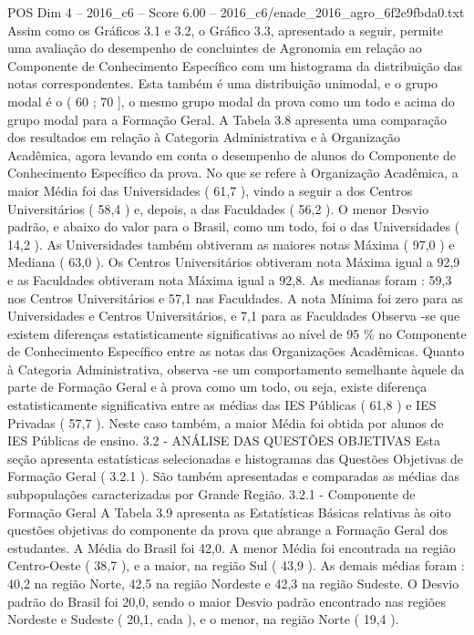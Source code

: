\begin{textsample}{POS Dim 4 – 2016\_c6 – Score 6.00 – 2016\_c6/enade\_2016\_agro\_6f2e9fbda0.txt}
Assim como os Gráficos 3.1 e 3.2, o Gráfico 3.3, apresentado a seguir, permite uma avaliação do desempenho de concluintes de Agronomia em relação ao Componente de Conhecimento Específico com um histograma da distribuição das notas correspondentes.
Esta também é uma distribuição unimodal, e o grupo modal é o ( 60 ; 70 ], o mesmo grupo modal da prova como um todo e acima do grupo modal para a Formação Geral.
A Tabela 3.8 apresenta uma comparação dos resultados em relação à Categoria Administrativa e à Organização Acadêmica, agora levando em conta o desempenho de alunos do Componente de Conhecimento Específico da prova.
No que se refere à Organização Acadêmica, a maior Média foi das Universidades ( 61,7 ), vindo a seguir a dos Centros Universitários ( 58,4 ) e, depois, a das Faculdades ( 56,2 ).
O menor Desvio padrão, e abaixo do valor para o Brasil, como um todo, foi o das Universidades ( 14,2 ).
As Universidades também obtiveram as maiores notas Máxima ( 97,0 ) e Mediana ( 63,0 ).
Os Centros Universitários obtiveram nota Máxima igual a 92,9 e as Faculdades obtiveram nota Máxima igual a 92,8.
As medianas foram : 59,3 nos Centros Universitários e 57,1 nas Faculdades.
A nota Mínima foi zero para as Universidades e Centros Universitários, e 7,1 para as Faculdades Observa -se que existem diferenças estatisticamente significativas ao nível de 95 \% no Componente de Conhecimento Específico entre as notas das Organizações Acadêmicas.
Quanto à Categoria Administrativa, observa -se um comportamento semelhante àquele da parte de Formação Geral e à prova como um todo, ou seja, existe diferença estatisticamente significativa entre as médias das IES Públicas ( 61,8 ) e IES Privadas ( 57,7 ).
Neste caso também, a maior Média foi obtida por alunos de IES Públicas de ensino. 3.2 - ANÁLISE DAS QUESTÕES OBJETIVAS Esta seção apresenta estatísticas selecionadas e histogramas das Questões Objetivas de Formação Geral ( 3.2.1 ).
São também apresentadas e comparadas as médias das subpopulações caracterizadas por Grande Região. 3.2.1 - Componente de Formação Geral A Tabela 3.9 apresenta as Estatísticas Básicas relativas às oito questões objetivas do componente da prova que abrange a Formação Geral dos estudantes.
A Média do Brasil foi 42,0.
A menor Média foi encontrada na região Centro-Oeste ( 38,7 ), e a maior, na região Sul ( 43,9 ).
As demais médias foram : 40,2 na região Norte, 42,5 na região Nordeste e 42,3 na região Sudeste.
O Desvio padrão do Brasil foi 20,0, sendo o maior Desvio padrão encontrado nas regiões Nordeste e Sudeste ( 20,1, cada ), e o menor, na região Norte ( 19,4 ).

\end{textsample}
